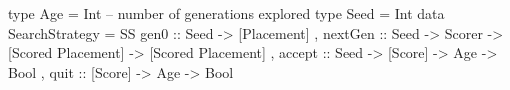 type Age  = Int -- number of generations explored
type Seed = Int
data SearchStrategy = 
 SS { gen0    :: Seed -> [Placement]
    , nextGen :: Seed -> Scorer 
              -> [Scored Placement] -> [Scored Placement]
    , accept  :: Seed -> [Score] -> Age -> Bool
    , quit    ::         [Score] -> Age -> Bool
    }
